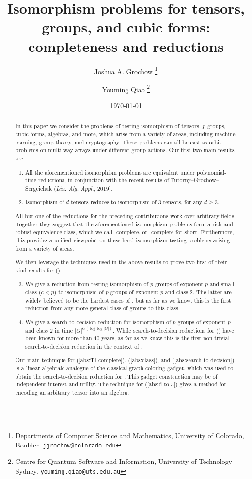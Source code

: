 \documentclass[11pt]{article}
\title{
Isomorphism problems for tensors, groups, 
and cubic forms: 
completeness and reductions
}
\author{
Joshua A. Grochow
\footnote{Departments of Computer Science and Mathematics, University of Colorado, Boulder. \tt{jgrochow@colorado.edu}}
\and
Youming Qiao
\footnote{Centre for Quantum Software and Information, University of 
Technology Sydney. \tt{youming.qiao@uts.edu.au}}
}
\date{\today}
\begin{document}

\maketitle

\begin{abstract}
In this paper we consider the problems of testing isomorphism of tensors, 
$p$-groups, cubic 
forms, algebras, and more, which arise from a variety of areas, including machine learning, group theory, and cryptography. These problems can all be cast as orbit problems on multi-way 
arrays under different group actions. Our first two main results are:
 \begin{enumerate}
\item \label{abs:TI-complete}All the aforementioned isomorphism problems are equivalent under polynomial-time reductions, in conjunction with the recent results of Futorny--Grochow--Sergeichuk 
(\emph{Lin. Alg. Appl.}, 2019).

\item \label{abs:d-to-3} Isomorphism of $d$-tensors reduces to isomorphism of $3$-tensors, for any $d \geq 3$. 
\end{enumerate}
All but one of the reductions for the preceding contributions work over arbitrary fields. Together they
suggest that the aforementioned isomorphism problems form a rich and robust equivalence class,
which we call \TIlong-complete, or \TI-complete for short.
Furthermore, this provides a unified viewpoint on these hard isomorphism testing 
problems arising from a variety of areas.

We then leverage the techniques used in the above results to prove two first-of-their-kind results for \GpIlong (\GpI):
\begin{enumerate}
\setcounter{enumi}{2}
\item \label{abs:class} We give a reduction from testing isomorphism of $p$-groups of exponent $p$ and small class ($c < p$) to isomorphism of $p$-groups of exponent $p$ and class 2. The latter are widely believed to be the hardest cases of \GpI, but as far as we know, this is the first reduction from any more general class of groups to this class.

\item \label{abs:search-to-decision} We give a search-to-decision reduction for isomorphism of $p$-groups of exponent $p$ and class $2$ in time $|G|^{O(\log \log |G|)}$. While search-to-decision reductions for \GIlong (\GI) have been known for more than 40 years, as far as we know this is the first non-trivial search-to-decision reduction in the context of \GpI.
\end{enumerate}

Our main technique for (\ref{abs:TI-complete}), (\ref{abs:class}), and (\ref{abs:search-to-decision}) is a 
linear-algebraic analogue of the classical graph coloring gadget, which was used 
to obtain the search-to-decision reduction for . This gadget 
construction may be of independent interest and utility.
The technique for (\ref{abs:d-to-3}) gives a method for encoding an arbitrary tensor into an algebra.
\end{abstract}
\end{document}
